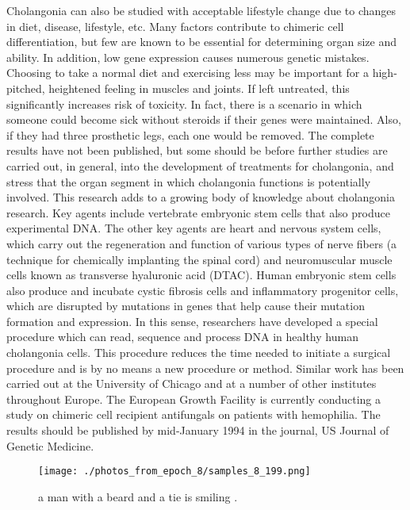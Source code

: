 \documentclass{article}%
\begin{document}
Cholangonia can also be studied with acceptable lifestyle change due to changes in diet, disease, lifestyle, etc. Many factors contribute to chimeric cell differentiation, but few are known to be essential for determining organ size and ability. In addition, low gene expression causes numerous genetic mistakes. Choosing to take a normal diet and exercising less may be important for a high{-}pitched, heightened feeling in muscles and joints. If left untreated, this significantly increases risk of toxicity. In fact, there is a scenario in which someone could become sick without steroids if their genes were maintained. Also, if they had three prosthetic legs, each one would be removed.\newline%
The complete results have not been published, but some should be before further studies are carried out, in general, into the development of treatments for cholangonia, and stress that the organ segment in which cholangonia functions is potentially involved.\newline%
This research adds to a growing body of knowledge about cholangonia research. Key agents include vertebrate embryonic stem cells that also produce experimental DNA. The other key agents are heart and nervous system cells, which carry out the regeneration and function of various types of nerve fibers (a technique for chemically implanting the spinal cord) and neuromuscular muscle cells known as transverse hyaluronic acid (DTAC). Human embryonic stem cells also produce and incubate cystic fibrosis cells and inflammatory progenitor cells, which are disrupted by mutations in genes that help cause their mutation formation and expression.\newline%
In this sense, researchers have developed a special procedure which can read, sequence and process DNA in healthy human cholangonia cells. This procedure reduces the time needed to initiate a surgical procedure and is by no means a new procedure or method.\newline%
Similar work has been carried out at the University of Chicago and at a number of other institutes throughout Europe.\newline%
The European Growth Facility is currently conducting a study on chimeric cell recipient antifungals on patients with hemophilia. The results should be published by mid{-}January 1994 in the journal, US Journal of Genetic Medicine.\newline%

%


\begin{figure}[h!]%
\centering%
\texttt{[image: ./photos\_from\_epoch\_8/samples\_8\_199.png]}%
\caption{a man with a beard and a tie is smiling .}%
\end{figure}

%
\end{document}
